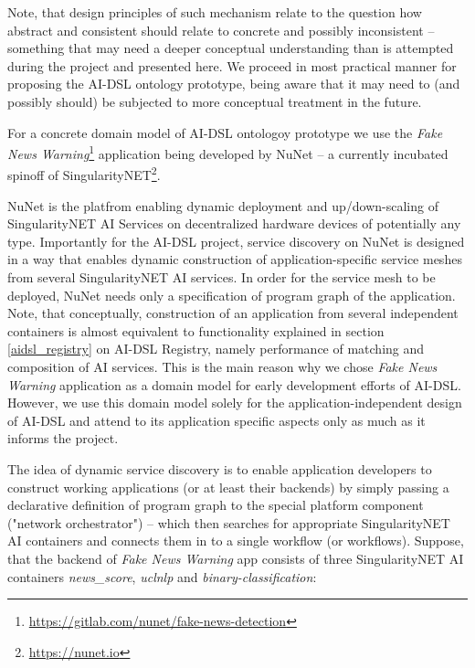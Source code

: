 \documentclass[]{report}
\begin{document}
Note, that design principles of such mechanism relate to the question how
abstract and consistent should relate to concrete and possibly inconsistent --
something that may need a deeper conceptual understanding than is attempted
during the project and presented here. We proceed in most practical manner for
proposing the AI-DSL ontology prototype, being aware that it may need to (and
possibly should) be subjected to more conceptual treatment in the future.

For a concrete domain model of AI-DSL ontologoy prototype we use the
\textit{Fake News
Warning}\footnote{\href{https://gitlab.com/nunet/fake-news-detection}{https://gitlab.com/nunet/fake-news-detection}}
application being developed by NuNet -- a currently incubated spinoff of
SingularityNET\footnote{\href{https://nunet.io}{https://nunet.io}}.

NuNet is the platfrom enabling dynamic deployment and up/down-scaling of
SingularityNET AI Services on decentralized hardware devices of potentially any
type. Importantly for the AI-DSL project, service discovery on NuNet is designed
in a way that enables dynamic construction of application-specific service
meshes from several SingularityNET AI services\cite{nunet_nunet_2021}. In order
for the service mesh to be deployed, NuNet needs only a specification of program
graph of the application. Note, that conceptually, construction of an
application from several independent containers is almost equivalent to
functionality explained in section \ref{aidsl_registry} on AI-DSL Registry,
namely performance of matching and composition of AI services. This is the main
reason why we chose \textit{Fake News Warning} application as a domain model
for early development efforts of AI-DSL. However, we use this domain model
solely for the application-independent design of AI-DSL and attend to
its application specific aspects only as much as it informs the project.

The idea of dynamic service discovery is to enable application developers to
construct working applications (or at least their backends) by simply passing a
declarative definition of program graph to the special platform component
("network orchestrator") -- which then searches for appropriate SingularityNET
AI containers and connects them in to a single workflow (or workflows).
Suppose, that the backend of \textit{Fake News Warning} app consists of three
SingularityNET AI containers \textit{news\_score}, \textit{uclnlp} and
\textit{binary-classification}:
\end{document}
